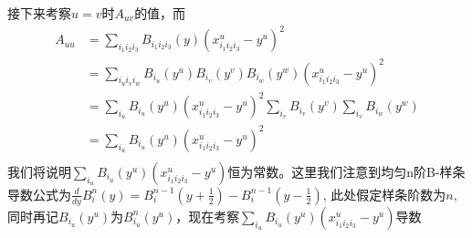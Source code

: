 接下来考察$u = v$时$A_{uv}$的值，而
\begin{equation}
    \begin{split}
        A_{uu} &= \sum_{i_1 i_2 i_3} B_{i_1 i_2 i_3}(y) (x_{i_1 i_2 i_3}^u - y^u)^2\\
            &= \sum_{i_u i_v i_w} B_{i_u}(y^u)B_{i_v}(y^v)B_{i_w}(y^w)(x_{i_1 i_2 i_3}^u - y^u)^2\\
            &= \sum_{i_u} B_{i_u}(y^u) (x_{i_1 i_2 i_3}^u - y^u)^2 \sum_{i_v}B_{i_v}(y^v)\sum_{i_v}B_{i_w}(y^w)\\
            &= \sum_{i_u} B_{i_u}(y^u) (x_{i_1 i_2 i_3}^u - y^u)^2\\ 
    \end{split}
\end{equation}
我们将说明$\sum_{i_u} B_{i_u}(y^u)(x_{i_1i_2i_3}^u - y^u)$恒为常数。这里我们注意到均匀n阶B-样条导数公式为$\frac{d}{dy} B_i^n(y) = B_i^{n-1}(y+\frac{1}{2}) - B_i^{n-1}(y - \frac{1}{2})$,
此处假定样条阶数为$n$,同时再记$B_{i_u}(y^u)$为$B_{i_u}^n(y^u)$，现在考察$\sum_{i_u} B_{i_u}(y^u)(x_{i_1i_2i_3}^u - y^u)$导数
